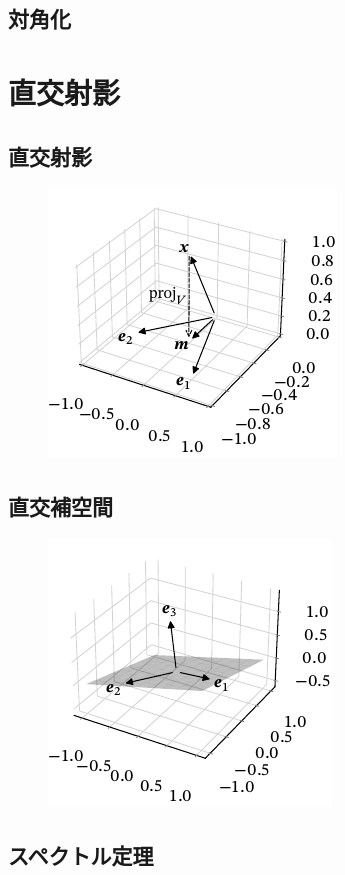 \documentclass[../../main]{subfiles}
\begin{document}
\subsection{対角化}

\section{直交射影}
\subsection{直交射影}
\begin{figure}[htbp]
  \centering
  \includegraphics{projection.pdf}
\end{figure}

\subsection{直交補空間}
\begin{figure}[htbp]
  \centering
  \includegraphics{orthogonal_complement.pdf}
\end{figure}
\subsection{スペクトル定理}
\end{document}
